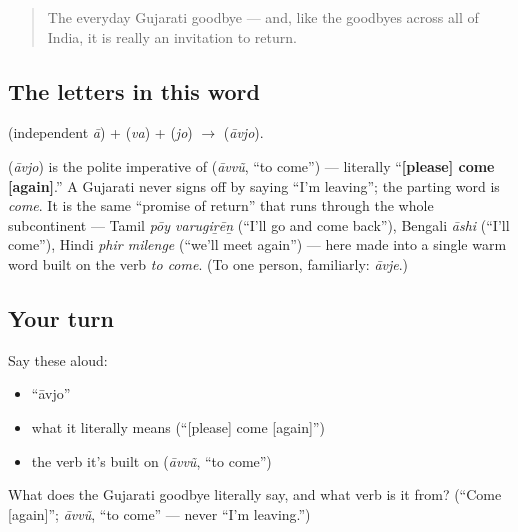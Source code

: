 \begin{quote}
The everyday Gujarati goodbye — and, like the goodbyes across all of India, it is really an invitation to return.
\end{quote}

\subsection*{The letters in this word}
\textbf{} (independent \emph{ā}) + \textbf{} (\emph{va}) + \textbf{} (\emph{jo}) $\to$ \textbf{} (\emph{āvjo}).

\begin{cousinweb}
\textbf{} (\emph{āvjo}) is the polite imperative of \textbf{} (\emph{āvvũ}, \textquotedblleft{}to come\textquotedblright{}) — literally \textquotedblleft{}\textbf{{[}please{]} come {[}again{]}}.\textquotedblright{} A Gujarati never signs off by saying \textquotedblleft{}I'm leaving\textquotedblright{}; the parting word is \emph{come}. It is the same \textquotedblleft{}promise of return\textquotedblright{} that runs through the whole subcontinent — Tamil \emph{pōy varugiṟēṉ} (\textquotedblleft{}I'll go and come back\textquotedblright{}), Bengali \emph{āshi} (\textquotedblleft{}I'll come\textquotedblright{}), Hindi \emph{phir milenge} (\textquotedblleft{}we'll meet again\textquotedblright{}) — here made into a single warm word built on the verb \emph{to come}. (To one person, familiarly: \textbf{} \emph{āvje}.)
\end{cousinweb}

\subsection*{Your turn}
Say these aloud:

\begin{itemize}
\raggedright
  \item \textquotedblleft{}āvjo\textquotedblright{}
  \item what it literally means (\textquotedblleft{}{[}please{]} come {[}again{]}\textquotedblright{})
  \item the verb it's built on (\emph{āvvũ}, \textquotedblleft{}to come\textquotedblright{})
\end{itemize}

\begin{tcolorbox}[breakable,colback=teal!4,colframe=teal!35!black,title={Before you move on}]
What does the Gujarati goodbye literally say, and what verb is it from? (\textquotedblleft{}Come {[}again{]}\textquotedblright{}; \emph{āvvũ}, \textquotedblleft{}to come\textquotedblright{} — never \textquotedblleft{}I'm leaving.\textquotedblright{})
\end{tcolorbox}
